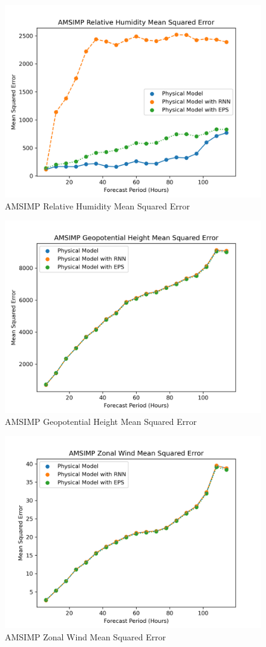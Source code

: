\begin{figure}[H]
    \centering
    \includegraphics[width=.8\linewidth]{Graphs/accuracy/comparsion_schemes/relative_humidity.png}
    \caption{AMSIMP Relative Humidity Mean Squared Error}
\end{figure}

\begin{figure}[H]
    \centering
    \includegraphics[width=.8\linewidth]{Graphs/accuracy/comparsion_schemes/geopotential_height.png}
    \caption{AMSIMP Geopotential Height Mean Squared Error}
\end{figure}

\begin{figure}[H]
    \centering
    \includegraphics[width=.8\linewidth]{Graphs/accuracy/comparsion_schemes/zonal_wind.png}
    \caption{AMSIMP Zonal Wind Mean Squared Error}
\end{figure}

